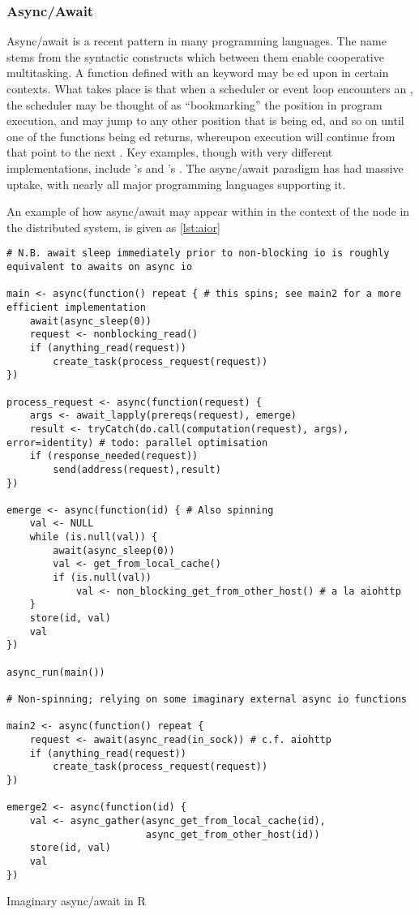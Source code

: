 \subsubsection{Async/Await}

Async/await is a recent pattern in many programming languages.
The name stems from the syntactic constructs which between them enable cooperative multitasking.
A function defined with an  keyword may be ed upon in certain contexts.
What takes place is that when a scheduler or event loop encounters an , the scheduler may be thought of as ``bookmarking'' the position in program execution, and may jump to any other position that is being ed, and so on until one of the functions being ed returns, whereupon execution will continue from that point to the next .
Key examples, though with very different implementations, include 's  and 's .
The async/await paradigm has had massive uptake, with nearly all major programming languages supporting it.

An example of how async/await may appear within \R in the context of the node in the distributed system, is given as \cref{lst:aior}

\begin{listing}
\begin{verbatim}
# N.B. await sleep immediately prior to non-blocking io is roughly equivalent to awaits on async io

main <- async(function() repeat { # this spins; see main2 for a more efficient implementation
    await(async_sleep(0))
    request <- nonblocking_read()
    if (anything_read(request))
        create_task(process_request(request))
})

process_request <- async(function(request) {
    args <- await_lapply(prereqs(request), emerge)
    result <- tryCatch(do.call(computation(request), args), error=identity) # todo: parallel optimisation
    if (response_needed(request))
        send(address(request),result)
})

emerge <- async(function(id) { # Also spinning
    val <- NULL
    while (is.null(val)) {
        await(async_sleep(0))
        val <- get_from_local_cache()
        if (is.null(val))
            val <- non_blocking_get_from_other_host() # a la aiohttp
    }
    store(id, val)
    val
})

async_run(main())

# Non-spinning; relying on some imaginary external async io functions

main2 <- async(function() repeat {
    request <- await(async_read(in_sock)) # c.f. aiohttp
    if (anything_read(request))
        create_task(process_request(request))
})

emerge2 <- async(function(id) {
    val <- async_gather(async_get_from_local_cache(id),
                        async_get_from_other_host(id))
    store(id, val)
    val
})
\end{verbatim}
\caption{Imaginary async/await in R}
\label{lst:aior}
\end{listing}


